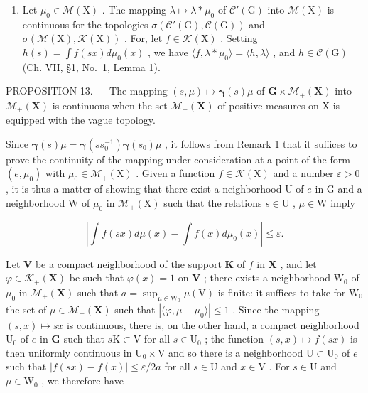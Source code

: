 \begin{enumerate}
\def\labelenumi{\arabic{enumi})}
\setcounter{enumi}{1}
\tightlist
\item
  Let \(\mu_0 \in \mathcal{M}(\mathrm{X})\) . The mapping \(\lambda \mapsto \lambda * \mu_0\) of \(\mathcal{C}'(\mathrm{G})\) into \(\mathcal{M}(\mathrm{X})\) is continuous for the topologies \(\sigma(\mathcal{C}'(\mathrm{G}), \mathcal{C}(\mathrm{G}))\) and \(\sigma(\mathcal{M}(\mathrm{X}), \mathcal{K}(\mathrm{X}))\) . For, let \(f \in \mathcal{K}(\mathrm{X})\) . Setting \(h(s) = \int f(sx) d\mu_0(x)\) , we have \(\langle f, \lambda * \mu_0 \rangle = \langle h, \lambda \rangle\) , and \(h \in \mathcal{C}(\mathrm{G})\) (Ch. VII, §1, No.~1, Lemma 1).
\end{enumerate}

PROPOSITION 13. --- The mapping \((s,\mu)\mapsto\boldsymbol{\gamma}(s)\mu\) of \(\mathbf{G}\times\mathcal{M}_{+}(\mathbf{X})\) into \(\mathcal{M}_{+}(\mathbf{X})\) is continuous when the set \(\mathcal{M}_{+}(\mathbf{X})\) of positive measures on X is equipped with the vague topology.

Since \(\pmb{\gamma}(s)\mu = \pmb{\gamma}(ss_0^{-1})\pmb{\gamma}(s_0)\mu\) , it follows from Remark 1 that it suffices to prove the continuity of the mapping under consideration at a point of the form \((e,\mu_0)\) with \(\mu_0\in \mathcal{M}_+(\mathrm{X})\) . Given a function \(f\in \mathcal{K}(\mathrm{X})\) and a number \(\varepsilon >0\) , it is thus a matter of showing that there exist a neighborhood U of \(e\) in G and a neighborhood W of \(\mu_0\) in \(\mathcal{M}_+(\mathrm{X})\) such that the relations \(s\in \mathrm{U}\) , \(\mu \in \mathrm{W}\) imply

\[
\left| \int f (s x) d \mu (x) - \int f (x) d \mu_ {0} (x) \right| \leqslant \varepsilon .\tag{6}
\]

Let \(\mathbf{V}\) be a compact neighborhood of the support \(\mathbf{K}\) of \(f\) in \(\mathbf{X}\) , and let \(\varphi \in \mathcal{K}_{+}(\mathbf{X})\) be such that \(\varphi(x) = 1\) on \(\mathbf{V}\) ; there exists a neighborhood \(\mathrm{W}_0\) of \(\mu_0\) in \(\mathcal{M}_{+}(\mathbf{X})\) such that \(a = \sup_{\mu \in \mathrm{W}_0} \mu(\mathrm{V})\) is finite: it suffices to take for \(\mathrm{W}_0\) the set of \(\mu \in \mathcal{M}_{+}(\mathbf{X})\) such that \(|\langle \varphi, \mu - \mu_0 \rangle| \leqslant 1\) . Since the mapping \((s, x) \mapsto sx\) is continuous, there is, on the other hand, a compact neighborhood \(\mathrm{U}_0\) of \(e\) in \(\mathbf{G}\) such that \(s\mathrm{K} \subset \mathrm{V}\) for all \(s \in \mathrm{U}_0\) ; the function \((s, x) \mapsto f(sx)\) is then uniformly continuous in \(\mathrm{U}_0 \times \mathrm{V}\) and so there is a neighborhood \(\mathrm{U} \subset \mathrm{U}_0\) of \(e\) such that \(|f(sx) - f(x)| \leqslant \varepsilon / 2a\) for all \(s \in \mathrm{U}\) and \(x \in \mathrm{V}\) . For \(s \in \mathrm{U}\) and \(\mu \in \mathrm{W}_0\) , we therefore have

